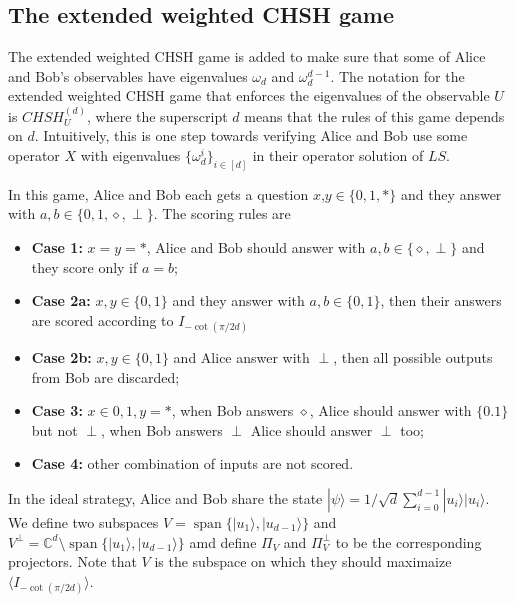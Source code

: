 \documentclass[11pt,letterpaper]{article}
\newcommand{\ket}[1]{|#1\rangle}
\DeclareMathOperator{\spn}{span}
\newcommand{\C}{\mathbb{C}}
\newcommand{\1}{\mathbb{1}}
\newcommand{\CHSH}{CHSH^{(d)}}
\newcommand{\LS}{LS}
\theoremstyle{definition}
\begin{document}
\subsection{The extended weighted CHSH game}
The extended weighted CHSH game is added to make sure that some of Alice and Bob's observables have
eigenvalues $\omega_d$ and $\omega_d^{d-1}$.
The notation for the extended weighted CHSH game that enforces the eigenvalues of the observable $U$ is 
$\CHSH_U$, where the superscript $d$ means that the rules of this game depends on $d$.
Intuitively, this is one step towards verifying Alice and Bob use some operator $X$ with eigenvalues
$\{\omega_d^i\}_{i \in [d]}$ in their operator solution of $\LS$.


In this game, Alice and Bob each gets a question $x$,$y \in \{ 0, 1, \ast\}$ and 
they answer with $a,b \in \{0,1,\diamond,\perp\}$. 
The scoring rules are
\begin{itemize}
	\item \textbf{Case 1:} $x = y = \ast$, Alice and Bob should answer with $a, b \in \{\diamond, \perp\}$ and 
	they score only if $a = b$;
	\item \textbf{Case 2a:} $x,y \in \{0,1\}$ and they answer with $a,b \in \{0,1\}$, then
	their answers are scored according to $I_{-\cot(\pi/2d)}$
	\item \textbf{Case 2b:} $x,y \in \{0,1\}$ and Alice answer with $\perp$, then all possible outputs from Bob
	are discarded;
	\item \textbf{Case 3:} $x \in {0,1}, y = \ast$, when Bob answers $\diamond$, Alice should answer with $\{0.1\}$ but not $\perp$,
	when Bob answers $\perp$ Alice should answer $\perp$ too;
	\item \textbf{Case 4:} other combination of inputs are not scored.
\end{itemize}
In the ideal strategy, Alice and Bob share the state $\ket{\psi} =1/\sqrt{d} \sum_{i=0}^{d-1} \ket{u_i}\ket{u_i}$.
We define two subspaces $V = \spn\{\ket{u_1}, \ket{u_{d-1}}\}$ and $V^\perp = \C^d \setminus\spn\{\ket{u_1}, \ket{u_{d-1}}\}$ amd
define $\Pi_V$ and $\Pi_{V}^\perp$ to be the corresponding projectors. Note that $V$ is the subspace on which they should
 maximaize $\langle I_{-\cot(\pi/2d)} \rangle$.
\end{document}
